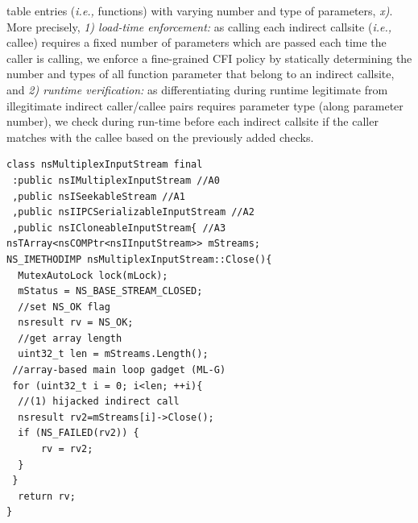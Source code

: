 table entries (\textit{i.e.,} functions) with varying number and type of parameters, \textit{x)}. More precisely, 
\textit{1) load-time enforcement:} as calling each indirect callsite (\textit{i.e.,} callee) requires a fixed number of parameters which are passed each time the caller is calling, 
we enforce a fine-grained CFI policy by statically determining the number and types of all function parameter that belong to an indirect callsite, and
\textit{2) runtime verification:} as differentiating during runtime legitimate from illegitimate indirect caller/callee pairs requires parameter type (along parameter number), we 
check during run-time before each indirect callsite if the caller matches with the callee based on the previously added checks.


\newsavebox{\firstlisting}
\begin{lrbox}{\firstlisting}
\begin{minipage}[c]{\linewidth}
\begin{verbatim}
class nsMultiplexInputStream final 
 :public nsIMultiplexInputStream //A0
 ,public nsISeekableStream //A1
 ,public nsIIPCSerializableInputStream //A2
 ,public nsICloneableInputStream{ //A3
nsTArray<nsCOMPtr<nsIInputStream>> mStreams;
NS_IMETHODIMP nsMultiplexInputStream::Close(){
  MutexAutoLock lock(mLock);
  mStatus = NS_BASE_STREAM_CLOSED;
  //set NS_OK flag
  nsresult rv = NS_OK;
  //get array length
  uint32_t len = mStreams.Length();
 //array-based main loop gadget (ML-G)
 for (uint32_t i = 0; i<len; ++i){
  //(1) hijacked indirect call
  nsresult rv2=mStreams[i]->Close();
  if (NS_FAILED(rv2)) {
      rv = rv2;
  }
 }
  return rv;
}
\end{verbatim}
\end{minipage}
\end{lrbox}

